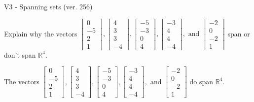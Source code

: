 \begin{exercise}
  \begin{exerciseTitle}V3 - Spanning sets (ver. 256)\end{exerciseTitle}
  \begin{exerciseStatement}
    Explain why the vectors \(\left[\begin{array}{r}
0 \\
-5 \\
2 \\
1
\end{array}\right] , \left[\begin{array}{r}
4 \\
3 \\
3 \\
-4
\end{array}\right] , \left[\begin{array}{r}
-5 \\
-3 \\
0 \\
4
\end{array}\right] , \left[\begin{array}{r}
-3 \\
4 \\
4 \\
-4
\end{array}\right] , \text{ and } \left[\begin{array}{r}
-2 \\
0 \\
-2 \\
1
\end{array}\right]\) span or don't span \(\mathbb{R}^4\). 
	


  \end{exerciseStatement}
  \begin{exerciseAnswer}
   The vectors \(\left[\begin{array}{r}
0 \\
-5 \\
2 \\
1
\end{array}\right] , \left[\begin{array}{r}
4 \\
3 \\
3 \\
-4
\end{array}\right] , \left[\begin{array}{r}
-5 \\
-3 \\
0 \\
4
\end{array}\right] , \left[\begin{array}{r}
-3 \\
4 \\
4 \\
-4
\end{array}\right] , \text{ and } \left[\begin{array}{r}
-2 \\
0 \\
-2 \\
1
\end{array}\right]\) 
  	 do  
	span \(\mathbb{R}^4\).
  



\end{exerciseAnswer}
\end{exercise}
